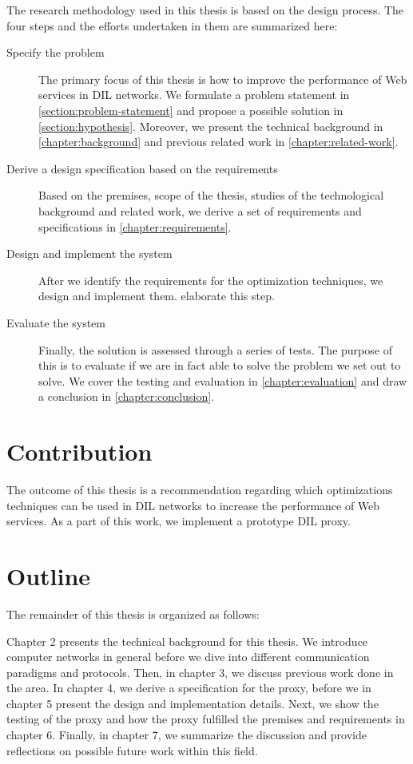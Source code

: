 The research methodology used in this thesis is based on the design process. The
four steps and the efforts undertaken in them are summarized here:

\begin{description}

    \item[Specify the problem] The primary focus of this thesis is how to improve
    the performance of Web services in DIL networks. We formulate a problem
    statement in \cref{section:problem-statement} and propose a possible
    solution in \cref{section:hypothesis}. Moreover, we present the technical
    background in \cref{chapter:background} and previous related work in
    \cref{chapter:related-work}.

    \item[Derive a design specification based on the requirements] Based on the
    premises, scope of the thesis, studies of the technological background and
    related work, we derive a set of requirements and specifications in
    \cref{chapter:requirements}.

    \item[Design and implement the system] After we identify the requirements
    for the optimization techniques, we design and implement them.
     elaborate this step.

    \item[Evaluate the system] Finally, the solution is assessed through a
    series of tests. The purpose of this is to evaluate if we are in fact able
    to solve the problem we set out to solve. We cover the testing and
    evaluation in \cref{chapter:evaluation} and draw a conclusion in
    \cref{chapter:conclusion}.

\end{description}


\section{Contribution}

The outcome of this thesis is a recommendation regarding which optimizations
techniques can be used in DIL networks to increase the performance of Web
services. As a part of this work, we implement a prototype DIL proxy.

\section{Outline}

The remainder of this thesis is organized as follows:

Chapter 2 presents the technical background for this thesis. We introduce
computer networks in general before we dive into different communication
paradigms and protocols. Then, in chapter 3, we discuss previous work done in
the area. In chapter 4, we derive a specification for the proxy, before we in
chapter 5 present the design and implementation details. Next, we show the
testing of the proxy and how the proxy fulfilled the premises and requirements
in chapter 6. Finally, in chapter 7, we summarize the discussion and provide
reflections on possible future work within this field.
